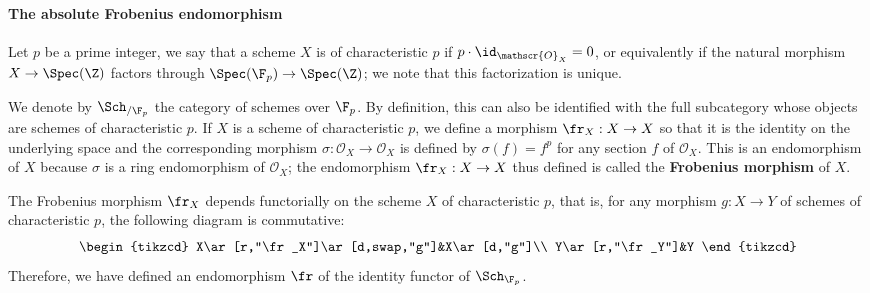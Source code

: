 \paragraph{The absolute Frobenius endomorphism}
Let $p$ be a prime integer, we say that a scheme $X$ is of characteristic $p$ if $p\cdot\id_{\mathscr{O}_X}=0$, or equivalently if the natural morphism $X\to\Spec(\Z)$ factors through $\Spec(\F_p)\to\Spec(\Z)$; we note that this factorization is unique.\par
We denote by $\Sch_{/\F_p}$ the category of schemes over $\F_p$. By definition, this can also be identified with the full subcategory whose objects are schemes of characteristic $p$. If $X$ is a scheme of characteristic $p$, we define a morphism $\fr_X:X\to X$ so that it is the identity on the underlying space and the corresponding morphism $\sigma:\mathscr{O}_X\to\mathscr{O}_X$ is defined by $\sigma(f)=f^p$ for any section $f$ of $\mathscr{O}_X$. This is an endomorphism of $X$ because $\sigma$ is a ring endomorphism of $\mathscr{O}_X$; the endomorphism $\fr_X:X\to X$ thus defined is called the \textbf{Frobenius morphism} of $X$.\par
The Frobenius morphism $\fr_X$ depends functorially on the scheme $X$ of characteristic $p$, that is, for any morphism $g:X\to Y$ of schemes of characteristic $p$, the following diagram is commutative:
\begin{equation}\label{scheme Frobenius morphism functorial}
\begin{tikzcd}
X\ar[r,"\fr_X"]\ar[d,swap,"g"]&X\ar[d,"g"]\\
Y\ar[r,"\fr_Y"]&Y
\end{tikzcd}
\end{equation}
Therefore, we have defined an endomorphism $\fr$ of the identity functor of $\Sch_{\F_p}$.

